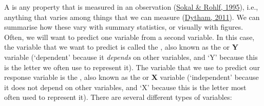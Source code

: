 \documentclass[
  openany]{krantz}
\begin{document}
A  is any property that is measured in an observation (\protect\hyperlink{ref-Sokal1995}{Sokal \& Rohlf, 1995}), i.e., anything that varies among things that we can measure (\protect\hyperlink{ref-Dytham2011}{Dytham, 2011}).
We can summarise how these  vary with summary statistics, or visually with figures.
Often, we will want to predict one variable from a second variable.
In this case, the variable that we want to predict is called the \textbf{}, also known as the \textbf{} or \textbf{Y} variable (`dependent' because it \emph{depends} on other variables, and `Y' because this is the letter we often use to represent it).
The variable that we use to predict our response variable is the \textbf{}, also known as the \textbf{} or \textbf{X} variable (`independent' because it does not depend on other variables, and `X' because this is the letter most often used to represent it).
There are several different types of variables:
\end{document}
